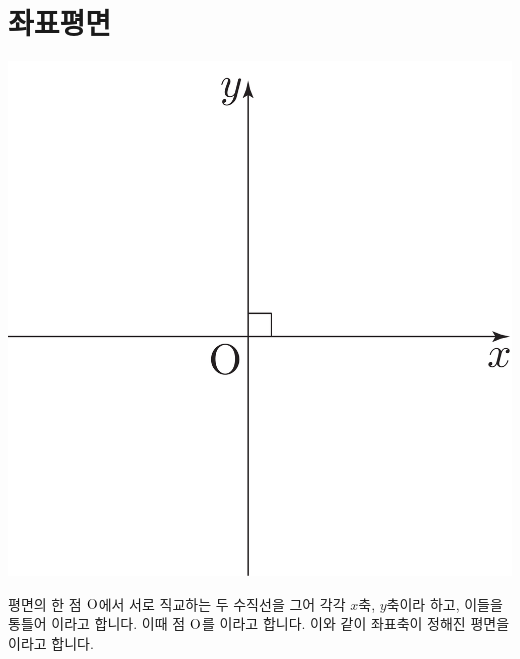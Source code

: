 \section{좌표평면}
\begin{center}
\includegraphics[scale=0.125]{pic0/pic142.pdf}
\end{center}평면의 한 점 $\mathrm{O}$에서 서로 직교하는 두 수직선을 그어 각각 $x$축, $y$축이라 하고, 이들을 통틀어 이라고 합니다. 이때 점 $\mathrm{O}$를 이라고 합니다. 이와 같이 좌표축이 정해진 평면을 이라고 합니다.
